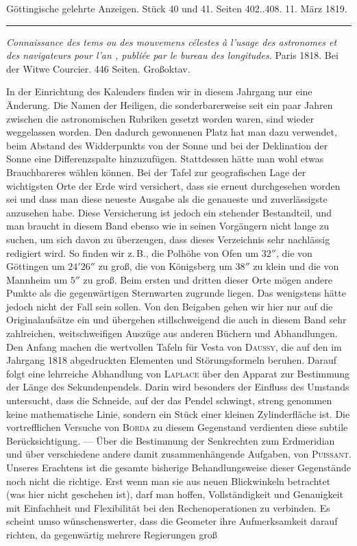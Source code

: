 \clearpage
{}
\begin{center}\small Göttingische gelehrte Anzeigen. Stück 40 und 41. Seiten 402..408. 11. März 1819.\\[3pt]\rule{.72\linewidth}{.3pt}\end{center}

\noindent\emph{Connaissance des tems ou des mouvemens célestes à l'usage des astronomes et des navigateurs pour l'an {}, publiée par le bureau des longitudes.} Paris 1818. Bei der Witwe Courcier. 446 Seiten. Großoktav.

\begingroup{}\relax
In der Einrichtung des Kalenders finden wir in diesem Jahrgang nur eine Änderung. Die Namen der Heiligen, die sonderbarerweise seit ein paar Jahren zwischen die astronomischen Rubriken gesetzt worden waren, sind wieder weggelassen worden. Den dadurch gewonnenen Platz hat man dazu verwendet, beim Abstand des Widderpunkts von der Sonne und bei der Deklination der Sonne eine Differenzspalte hinzuzufügen. Stattdessen hätte man wohl etwas Brauchbareres wählen können. Bei der Tafel zur geografischen Lage der wichtigsten Orte der Erde wird versichert, dass sie erneut durchgesehen worden sei und dass man diese neueste Ausgabe als die genaueste und zuverlässigste anzusehen habe. Diese Versicherung ist jedoch ein stehender Bestandteil, und man braucht in diesem Band ebenso wie in seinen Vorgängern nicht lange zu suchen, um sich davon zu überzeugen, dass dieses Verzeichnis sehr nachlässig redigiert wird. So finden wir z.\,B., die Polhöhe von Ofen um $32''$, die von Göttingen um $24' 26''$ zu groß, die von Königsberg um $38''$ zu klein und die von Mannheim um $5''$ zu groß. Beim ersten und dritten dieser Orte mögen andere Punkte als die gegenwärtigen Sternwarten zugrunde liegen. Das wenigstens hätte jedoch nicht der Fall sein sollen. Von den Beigaben gehen wir hier nur auf die Originalaufsätze ein und übergehen stillschweigend die auch in diesem Band sehr zahlreichen, weitschweifigen Auszüge aus anderen Büchern und Abhandlungen. Den Anfang machen die wertvollen Tafeln für Vesta von \textsc{Daussy}, die auf den im Jahrgang 1818 abgedruckten Elementen und Störungsformeln beruhen. Darauf folgt eine lehrreiche Abhandlung von \textsc{Laplace} über den Apparat zur Bestimmung der Länge des Sekundenpendels. Darin wird besonders der Einfluss des Umstands untersucht, dass die Schneide, auf der das Pendel schwingt, streng genommen keine mathematische Linie, sondern ein Stück einer kleinen Zylinderfläche ist. Die vortrefflichen Versuche von \textsc{Borda} zu diesem Gegenstand verdienten diese subtile Berücksichtigung. --- Über die Bestimmung der Senkrechten zum Erdmeridian und über verschiedene andere damit zusammenhängende Aufgaben, von \textsc{Puissant}. Unseres Erachtens ist die gesamte bisherige Behandlungsweise dieser Gegenstände noch nicht die richtige. Erst wenn man sie aus neuen Blickwinkeln betrachtet (was hier nicht geschehen ist), darf man hoffen, Vollständigkeit und Genauigkeit mit Einfachheit und Flexibilität bei den Rechenoperationen zu verbinden. Es scheint umso wünschenswerter, dass die Geometer ihre Aufmerksamkeit darauf richten, da gegenwärtig mehrere Regierungen groß 